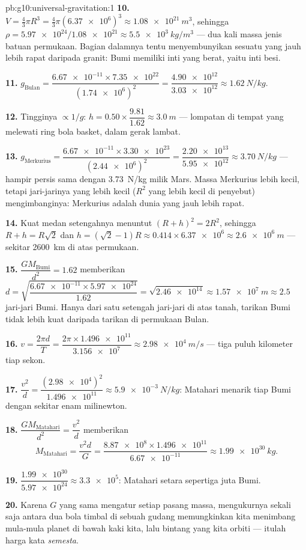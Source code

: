 \begin{solution}{pb:g10:universal-gravitation:1}
\textbf{10.} $V = \frac43 \pi R^3 = \frac43 \pi
(\num{6.37e6})^3 \approx \qty{1.08e21}{m^3}$, sehingga
$\rho = \num{5.97e24}/\num{1.08e21} \approx \qty{5.5e3}{kg/m^3}$ ---
dua kali massa jenis batuan permukaan. Bagian dalamnya tentu
menyembunyikan sesuatu yang jauh lebih rapat daripada granit: Bumi
memiliki inti yang berat, yaitu inti besi.

\textbf{11.} $g_{\text{Bulan}} = \dfrac{\num{6.67e-11} \times
\num{7.35e22}}{(\num{1.74e6})^2} = \dfrac{\num{4.90e12}}
{\num{3.03e12}} \approx \qty{1.62}{N/kg}$.

\textbf{12.} Tingginya $\propto 1/g$:
$h = 0.50 \times \dfrac{9.81}{1.62} \approx \qty{3.0}{m}$ --- lompatan
di tempat yang melewati ring bola basket, dalam gerak lambat.

\textbf{13.} $g_{\text{Merkurius}} = \dfrac{\num{6.67e-11} \times
\num{3.30e23}}{(\num{2.44e6})^2} = \dfrac{\num{2.20e13}}
{\num{5.95e12}} \approx \qty{3.70}{N/kg}$ --- hampir persis sama dengan
\qty{3.73}{N/kg} milik Mars. Massa Merkurius lebih kecil, tetapi
jari-jarinya yang lebih kecil ($R^2$ yang lebih kecil di penyebut)
mengimbanginya: Merkurius adalah dunia yang jauh lebih rapat.

\textbf{14.} Kuat medan setengahnya menuntut
$(R + h)^2 = 2 R^2$, sehingga $R + h = R\sqrt{2}$ dan
$h = (\sqrt{2} - 1) R \approx 0.414 \times \num{6.37e6}
\approx \qty{2.6e6}{m}$ --- sekitar \qty{2600}{km} di atas permukaan.

\textbf{15.} $\dfrac{G M_{\text{Bumi}}}{d^2} = 1.62$ memberikan
$d = \sqrt{\dfrac{\num{6.67e-11} \times \num{5.97e24}}{1.62}}
= \sqrt{\num{2.46e14}} \approx \qty{1.57e7}{m} \approx 2.5$ jari-jari
Bumi. Hanya dari satu setengah jari-jari di atas tanah, tarikan Bumi
tidak lebih kuat daripada tarikan di permukaan Bulan.

\textbf{16.} $v = \dfrac{2\pi d}{T}
= \dfrac{2\pi \times \num{1.496e11}}{\num{3.156e7}}
\approx \qty{2.98e4}{m/s}$ --- tiga puluh kilometer tiap sekon.

\textbf{17.} $\dfrac{v^2}{d} = \dfrac{(\num{2.98e4})^2}{\num{1.496e11}}
\approx \qty{5.9e-3}{N/kg}$: Matahari menarik tiap  Bumi dengan
sekitar enam milinewton.

\textbf{18.} $\dfrac{G M_{\text{Matahari}}}{d^2} = \dfrac{v^2}{d}$
memberikan
\[
M_{\text{Matahari}} = \frac{v^2 d}{G}
= \frac{\num{8.87e8} \times \num{1.496e11}}{\num{6.67e-11}}
\approx \qty{1.99e30}{kg}.
\]

\textbf{19.} $\dfrac{\num{1.99e30}}{\num{5.97e24}} \approx
\num{3.3e5}$: Matahari setara sepertiga juta Bumi.

\textbf{20.} Karena $G$ yang sama mengatur setiap pasang massa,
mengukurnya sekali saja antara dua bola timbal di sebuah gudang
memungkinkan kita menimbang mula-mula planet di bawah kaki kita, lalu
bintang yang kita orbiti --- itulah harga kata \emph{semesta}.
\end{solution}
